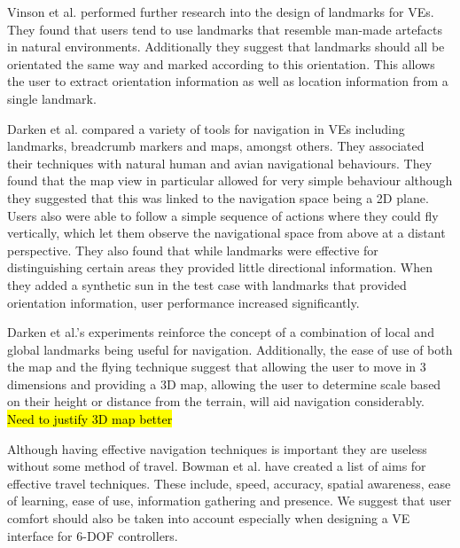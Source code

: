 \documentclass{sig-alternate-05-2015}
\begin{document}
Vinson et al. performed further research into the design of landmarks for VEs.\cite{Vinson1999} They found that users tend to use landmarks that resemble man-made artefacts in natural environments. Additionally they suggest that landmarks should all be orientated the same way and marked according to this orientation. This allows the user to extract orientation information as well as location information from a single landmark.

Darken et al. compared a variety of tools for navigation in VEs including landmarks, breadcrumb markers and maps, amongst others\cite{Darken1993}. They associated their techniques with natural human and avian  navigational behaviours.  They found that the map view in particular allowed for very simple behaviour although they suggested that this was linked to the navigation space being a 2D plane. Users also were able to follow a simple sequence of actions where they could fly vertically, which let them observe the navigational space from above at a distant perspective. They also found that while landmarks were effective for distinguishing certain areas they provided little directional information. When they added a synthetic sun in the test case with landmarks that provided orientation information, user performance increased significantly. %

Darken et al.'s experiments reinforce the concept of a combination of local and global landmarks being useful for navigation\cite{Darken1993}. Additionally, the ease of use of both the map and the flying technique suggest that allowing the user to move in 3 dimensions and providing a 3D map, allowing the user to determine scale based on their height or distance from the terrain, will aid navigation considerably.
\hl{Need to justify 3D map better} 

Although having effective navigation techniques is important they are useless without some method of travel. Bowman et al. have created a list of aims for effective travel techniques.\cite{Bowman1997} These include, speed, accuracy, spatial awareness, ease of learning, ease of use, information gathering and presence. We suggest that user comfort should also be taken into account especially when designing a VE interface for 6-DOF controllers.
\end{document}
